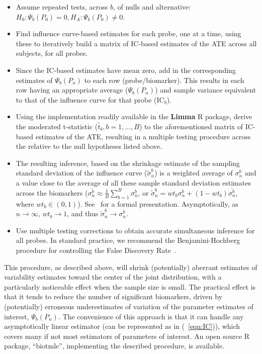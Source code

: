 \begin{itemize}
\item Assume repeated tests, across $b$, of nulls and alternative:
    $H_0: \Psi_b(P_0) = 0, H_A: \Psi_b(P_0) \ne 0 $.
\item Find influence curve-based estimates for each probe, one at a time, using
    these to iteratively build a matrix of IC-based estimates of the ATE across
    all subjects, for all probes.
\item Since the IC-based estimates have mean zero, add in the corresponding
    estimates of $\Psi_b(P_n)$ to each row (probe/biomarker). This results in
    each row having an appropriate average ($\Psi_b(P_n)$) and sample variance
    equivalent to that of the influence curve for that probe ($\text{IC}_b$).
\item  Using the implementation readily available in the \textbf{Limma} R
    package, derive the moderated t-statistic ($ \tilde{t_b}, b = 1, \dots, B $)
    to the aforementioned matrix of IC-based estimates of the ATE, resulting in
    a multiple testing procedure across the relative to the null hypotheses
    listed above.
\item The resulting inference, based on the  shrinkage estimate of the
    sampling standard deviation of the influence curve ($\tilde{\sigma}^b_n$) is
    a weighted average of $\sigma^b_n$ and a value close to the average of all
    these sample standard deviation estimates across the biomarkers
    ($\overline{\sigma^b_n} \approx \frac{1}{B} \sum_{b = 1}^B \sigma^b_n$, or
    $\widetilde{\sigma}^b_n = wt_b \sigma^b_n+(1 - wt_b)\overline{\sigma^b_n}$,
    where $wt_b \in (0, 1)$). See~\cite{smyth2005limma} for a formal
    presentation. Asymptotically, as $n \rightarrow \infty$,
    $wt_b \rightarrow 1$, and thus
    $\widetilde{\sigma}^b_n \rightarrow \sigma^b_n$.
\item Use multiple testing corrections to obtain accurate simultaneous inference
    for all probes. In standard practice, we recommend the Benjamini-Hochberg
    procedure for controlling the False Discovery
    Rate~\cite{benjamini1995controlling}.
\end{itemize}

This procedure, as described above, will shrink (potentially) aberrant
estimates of variability estimates toward the center of the joint distribution,
with a particularly noticeable effect when the sample size is small. The
practical effect is that it tends to reduce the number of significant
biomarkers, driven by (potentially) erroneous underestimates of variation of
the parameter estimates of interest, $\Psi_b(P_n)$. The convenience of this
approach is that it can handle any asymptotically linear estimator (can be
represented as in (~\ref{eqn:IC})), which covers many if not most estimators of
parameters of interest. An open source R package, ``biotmle'', implementing the
described procedure, is available.
